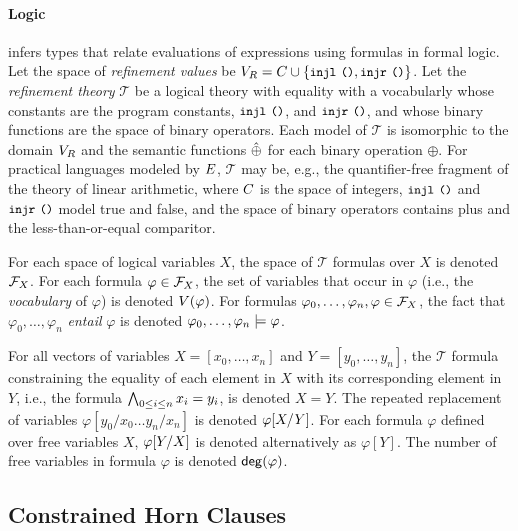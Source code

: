 \paragraph{Logic}
\sys infers types that relate evaluations of expressions using
formulas in formal logic.
%
Let the space of \emph{refinement values} be
$\fovals = \consts \union \elts{ \injl\ \unit, \injr\ \unit }$.
%
Let the \emph{refinement theory} $\mathcal{T}$ be a logical theory
with equality with a vocabularly whose constants are the program
constants, $\injl\ \unit$, and $\injr\ \unit$, and whose binary
functions are the space of binary operators.
%
Each model of $\mathcal{T}$ is isomorphic to the domain $\fovals$ and
the semantic functions $\interp{\oplus}$ for each binary operation
$\oplus$.
%
For practical languages modeled by $\expr$, $\mathcal{T}$ may be,
e.g., the quantifier-free fragment of the theory of linear arithmetic,
where $\consts$ is the space of integers, $\injl\ \unit$ and
$\injr\ \unit$ model true and false, and the space of binary operators
contains plus and the less-than-or-equal comparitor.

For each space of logical variables $X$, the space of $\mathcal{T}$
formulas over $X$ is denoted $\formulas{ X }$.
%
For each formula $\varphi \in \formulas{X}$, the set of variables that
occur in $\varphi$ (i.e., the \emph{vocabulary} of $\varphi$) is
denoted $\vocab(\varphi)$.
For formulas $\varphi_0, \ldots, \varphi_n, \varphi \in \formulas{X}$,
the fact that $\varphi_0, \ldots, \varphi_n$ \emph{entail} $\varphi$
is denoted $\varphi_0, \ldots, \varphi_n \entails \varphi$.

For all vectors of variables $X = [ x_0, \ldots, x_n ]$ and
$Y = [ y_0, \ldots, y_n ]$, the $\mathcal{T}$ formula constraining the
equality of each element in $X$ with its corresponding element in $Y$,
i.e., the formula $\bigland_{0 \leq i \leq n} x_i = y_i$, is denoted
$X = Y$.
%
The repeated replacement of variables $\varphi[ y_0 / x_0 \ldots y_{n}
/ x_{n} ]$ is denoted $\replace{\varphi}{Y}{X}$.
%
For each formula $\varphi$ defined over free variables $X$,
$\replace{\varphi}{X}{Y}$ is denoted alternatively as $\varphi[Y]$.
%
The number of free variables in formula $\varphi$ is denoted
$\degreeof(\varphi)$.

\subsection{Constrained Horn Clauses}
\label{sec:chcs}

